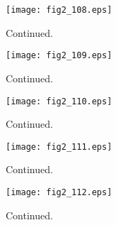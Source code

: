 \documentclass[preprint]{aastex}
\begin{document}
\setcounter{figure}{1}
\begin{figure}[t]
\centering
\texttt{[image: fig2\_108.eps]}
\caption{
Continued. 
}
\label{Fig2}
\end{figure}
\clearpage



\setcounter{figure}{1}
\begin{figure}[t]
\centering
\texttt{[image: fig2\_109.eps]}
\caption{
Continued. 
}
\label{Fig2}
\end{figure}
\clearpage



\setcounter{figure}{1}
\begin{figure}[t]
\centering
\texttt{[image: fig2\_110.eps]}
\caption{
Continued. 
}
\label{Fig2}
\end{figure}
\clearpage



\setcounter{figure}{1}
\begin{figure}[t]
\centering
\texttt{[image: fig2\_111.eps]}
\caption{
Continued. 
}
\label{Fig2}
\end{figure}
\clearpage



\setcounter{figure}{1}
\begin{figure}[t]
\centering
\texttt{[image: fig2\_112.eps]}
\caption{
Continued. 
}
\label{Fig2}
\end{figure}
\clearpage
\end{document}
